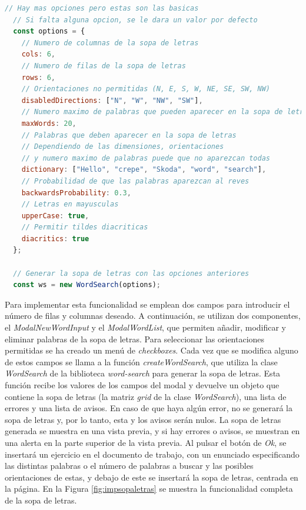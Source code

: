\begin{lstlisting}[label=fig:impsopaletrasopciones, caption=Opciones para la sopa de letras., language=JavaScript, float, floatplacement=H]
  // Hay mas opciones pero estas son las basicas
  // Si falta alguna opcion, se le dara un valor por defecto
  const options = {
    // Numero de columnas de la sopa de letras
    cols: 6,
    // Numero de filas de la sopa de letras
    rows: 6,
    // Orientaciones no permitidas (N, E, S, W, NE, SE, SW, NW)
    disabledDirections: ["N", "W", "NW", "SW"],
    // Numero maximo de palabras que pueden aparecer en la sopa de letras
    maxWords: 20,
    // Palabras que deben aparecer en la sopa de letras
    // Dependiendo de las dimensiones, orientaciones
    // y numero maximo de palabras puede que no aparezcan todas
    dictionary: ["Hello", "crepe", "Skoda", "word", "search"],
    // Probabilidad de que las palabras aparezcan al reves
    backwardsProbability: 0.3,
    // Letras en mayusculas
    upperCase: true,
    // Permitir tildes diacriticas
    diacritics: true
  };

  // Generar la sopa de letras con las opciones anteriores
  const ws = new WordSearch(options);
\end{lstlisting}

Para implementar esta funcionalidad se emplean dos campos para introducir el número de filas y columnas deseado. A continuación, se utilizan dos componentes, el \textit{ModalNewWordInput} y el \textit{ModalWordList}, que permiten añadir, modificar y eliminar palabras de la sopa de letras. Para seleccionar las orientaciones permitidas se ha creado un menú de \textit{checkboxes}. Cada vez que se modifica alguno de estos campos se llama a la función \textit{createWordSearch}, que utiliza la clase \textit{WordSearch} de la biblioteca \textit{word-search} para generar la sopa de letras. Esta función recibe los valores de los campos del modal y devuelve un objeto que contiene la sopa de letras (la matriz \textit{grid} de la clase \textit{WordSearch}), una lista de errores y una lista de avisos. En caso de que haya algún error, no se generará la sopa de letras y, por lo tanto, esta y los avisos serán nulos. La sopa de letras generada se muestra en una vista previa, y si hay errores o avisos, se muestran en una alerta en la parte superior de la vista previa. Al pulsar el botón de \textit{Ok}, se insertará un ejercicio en el documento de trabajo, con un enunciado especificando las distintas palabras o el número de palabras a buscar y las posibles orientaciones de estas, y debajo de este se insertará la sopa de letras, centrada en la página. En la Figura \ref{fig:impsopaletras} se muestra la funcionalidad completa de la sopa de letras.

